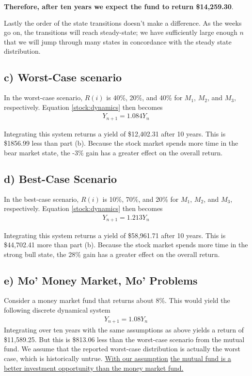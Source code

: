 \documentclass[11pt,letterpaper]{article}
\begin{document}
{\bf Therefore, after ten years we expect the fund to return \$14,259.30}.

Lastly the order of the state transitions doesn't make a difference. As the weeks go on, the transitions will reach steady-state; we have sufficiently large enough $n$ that we will jump through many states in concordance with the steady state distribution.

\subsection*{c) Worst-Case scenario}
In the worst-case scenario, $R(i)$ is 40\%, 20\%, and 40\% for $M_1$, $M_2$, and $M_3$, respectively. Equation \eqref{stock:dynamics} then becomes
\begin{align*}
Y_{n+1} = 1.084Y_n
\end{align*}

Integrating this system returns a yield of \$12,402.31 after 10 years. This is \$1856.99 less than part (b). Because the stock market spends more time in the bear market state, the -3\% gain has a greater effect on the overall return.


\subsection*{d) Best-Case Scenario}
In the best-case scenario, $R(i)$ is 10\%, 70\%, and 20\% for $M_1$, $M_2$, and $M_3$, respectively. Equation \eqref{stock:dynamics} then becomes
\begin{align*}
Y_{n+1} = 1.213Y_n
\end{align*}

Integrating this system returns a yield of \$58,961.71 after 10 years. This is \$44,702.41 more than part (b). Because the stock market spends more time in the strong bull state, the 28\% gain has a greater effect on the overall return.



\subsection*{e) Mo' Money Market, Mo' Problems}
Consider a money market fund that returns about 8\%. This would yield the following discrete dynamical system
\begin{align*}
Y_{n+1} = 1.08Y_n
\end{align*}
Integrating over ten years with the same assumptions as above yields a return of \$11,589.25. But this is \$813.06 less than the worst-case scenario from the mutual fund. We assume that the reported worst-case distribution is actually the worst case, which is historically untrue. \underline{With our assumption}
\underline{the mutual fund is a better investment opportunity than the money market fund.}
\end{document}
